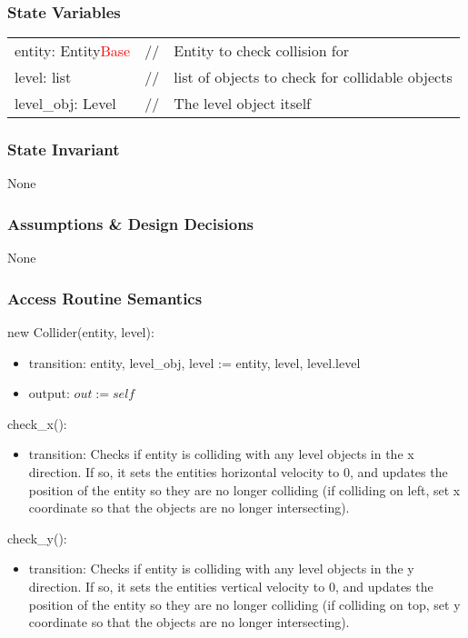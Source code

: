 \documentclass[12pt]{article}
\begin{document}
\subsubsection* {State Variables}

\begin{tabular}{lll}
    entity: Entity\textcolor{red}{Base} & // & Entity to check collision for \\
    level: list & // & list of objects to check for collidable objects \\
    level\_obj: Level & // & The level object itself
\end{tabular}

\subsubsection* {State Invariant}

None

\subsubsection* {Assumptions \& Design Decisions}

None

\subsubsection* {Access Routine Semantics}

new Collider(entity, level):
\begin{itemize}
    \item transition: entity, level\_obj, level := entity, level, level.level
    \item output: $out := self$
\end{itemize}

check\_x():
\begin{itemize}
    \item transition: Checks if entity is colliding with any level objects in the x direction. If so, it sets the entities horizontal velocity to 0, and updates the position of the entity so they are no longer colliding (if colliding on left, set x coordinate so that the objects are no longer intersecting).
\end{itemize}

check\_y():
\begin{itemize}
    \item transition: Checks if entity is colliding with any level objects in the y direction. If so, it sets the entities vertical velocity to 0, and updates the position of the entity so they are no longer colliding (if colliding on top, set y coordinate so that the objects are no longer intersecting).
\end{itemize}
\end{document}

